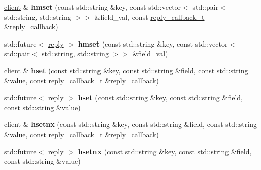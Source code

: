 \begin{DoxyCompactItemize}
\item 
\mbox{\label{classcpp__redis_1_1client_a8c5f96c6e663d89aa18baba495872cfb}} 
\hyperlink{classcpp__redis_1_1client}{client} \& {\bfseries hmset} (const std\+::string \&key, const std\+::vector$<$ std\+::pair$<$ std\+::string, std\+::string $>$$>$ \&field\+\_\+val, const \hyperlink{classcpp__redis_1_1client_a061a1140d36d2eaeda82b09a0bb3f9f2}{reply\+\_\+callback\+\_\+t} \&reply\+\_\+callback)
\item 
\mbox{\label{classcpp__redis_1_1client_acbb8d8fa40a64a155e19e49aae12f117}} 
std\+::future$<$ \hyperlink{classcpp__redis_1_1reply}{reply} $>$ {\bfseries hmset} (const std\+::string \&key, const std\+::vector$<$ std\+::pair$<$ std\+::string, std\+::string $>$$>$ \&field\+\_\+val)
\item 
\mbox{\label{classcpp__redis_1_1client_a3d5367719dc31fb3dfa49202d1e7f9ad}} 
\hyperlink{classcpp__redis_1_1client}{client} \& {\bfseries hset} (const std\+::string \&key, const std\+::string \&field, const std\+::string \&value, const \hyperlink{classcpp__redis_1_1client_a061a1140d36d2eaeda82b09a0bb3f9f2}{reply\+\_\+callback\+\_\+t} \&reply\+\_\+callback)
\item 
\mbox{\label{classcpp__redis_1_1client_ae212c8371dbd9ceff386f789226eb173}} 
std\+::future$<$ \hyperlink{classcpp__redis_1_1reply}{reply} $>$ {\bfseries hset} (const std\+::string \&key, const std\+::string \&field, const std\+::string \&value)
\item 
\mbox{\label{classcpp__redis_1_1client_a6cf21d60012fc82075deb801a32e8d60}} 
\hyperlink{classcpp__redis_1_1client}{client} \& {\bfseries hsetnx} (const std\+::string \&key, const std\+::string \&field, const std\+::string \&value, const \hyperlink{classcpp__redis_1_1client_a061a1140d36d2eaeda82b09a0bb3f9f2}{reply\+\_\+callback\+\_\+t} \&reply\+\_\+callback)
\item 
\mbox{\label{classcpp__redis_1_1client_a72b5a16cc761f51e9986bcfcf644e999}} 
std\+::future$<$ \hyperlink{classcpp__redis_1_1reply}{reply} $>$ {\bfseries hsetnx} (const std\+::string \&key, const std\+::string \&field, const std\+::string \&value)
\item 

\end{DoxyCompactItemize}
